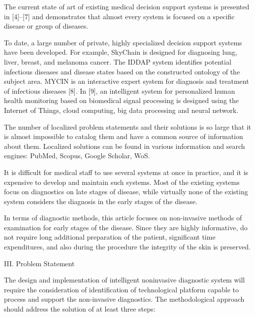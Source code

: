 \documentclass[twocolumn]{scndocument}
\begin{document}
\setcounter{page}{150}

The current state of art of existing medical decision support systems is presented in [4]–[7] and demonstrates that almost every system is focused on a specific disease or group of diseases.

To date, a large number of private, highly specialized decision support systems have been developed. For
example, SkyChain is designed for diagnosing lung,
liver, breast, and melanoma cancer. The IDDAP system
identifies potential infectious diseases and disease states
based on the constructed ontology of the subject area.
MYCIN is an interactive expert system for diagnosis and
treatment of infectious diseases [8]. In [9], an intelligent
system for personalized human health monitoring based
on biomedical signal processing is designed using the
Internet of Things, cloud computing, big data processing
and neural network.

The number of localized problem statements and their
solutions is so large that it is almost impossible to catalog
them and have a common source of information about
them. Localized solutions can be found in various information and search engines: PubMed, Scopus, Google
Scholar, WoS.

It is difficult for medical staff to use several systems at
once in practice, and it is expensive to develop and maintain such systems. Most of the existing systems focus on
diagnostics on late stages of disease, while virtually none
of the existing system considers the diagnosis in the early
stages of the disease.

In terms of diagnostic methods, this article focuses on
non-invasive methods of examination for early stages of
the disease. Since they are highly informative, do not
require long additional preparation of the patient, significant time expenditures, and also during the procedure
the integrity of the skin is preserved.

\begin{center}
\vspace{-3pt}
III. Problem Statement
\vspace{-3pt}
\end{center}

The design and implementation of intelligent noninvasive diagnostic system will require the consideration
of identification of technological platform capable to
process and support the non-invasive diagnostics. The
methodological approach should address the solution of
at least three steps:
\end{document}
